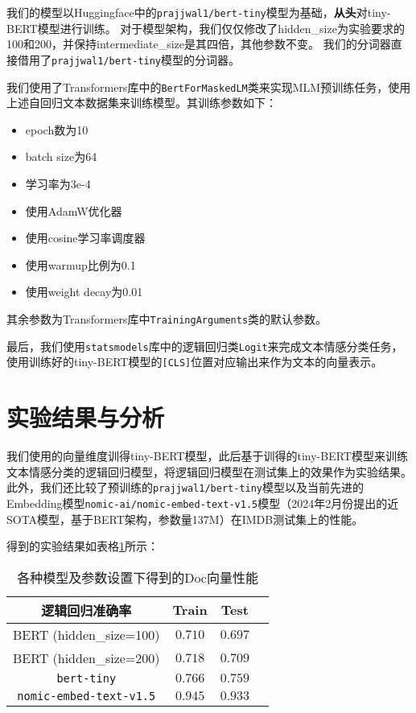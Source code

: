 \documentclass{article}
\begin{document}
我们的模型以Huggingface中的\verb|prajjwal1/bert-tiny|模型为基础，\textbf{从头}对tiny-BERT模型进行训练。
对于模型架构，我们仅仅修改了hidden_size为实验要求的100和200，并保持intermediate_size是其四倍，其他参数不变。
我们的分词器直接借用了\verb|prajjwal1/bert-tiny|模型的分词器。

我们使用了Transformers库中的\verb|BertForMaskedLM|类来实现MLM预训练任务，使用上述自回归文本数据集来训练模型。其训练参数如下：
\begin{itemize}
  \item epoch数为10
  \item batch size为64
  \item 学习率为3e-4
  \item 使用AdamW优化器
  \item 使用cosine学习率调度器
  \item 使用warmup比例为0.1
  \item 使用weight decay为0.01
\end{itemize}
其余参数为Transformers库中\verb|TrainingArguments|类的默认参数。

最后，我们使用\verb|statsmodels|库中的逻辑回归类\verb|Logit|来完成文本情感分类任务，
使用训练好的tiny-BERT模型的\verb|[CLS]|位置对应输出来作为文本的向量表示。



\section{实验结果与分析}

我们使用的向量维度训得tiny-BERT模型，此后基于训得的tiny-BERT模型来训练文本情感分类的逻辑回归模型，将逻辑回归模型在测试集上的效果作为实验结果。
此外，我们还比较了预训练的\verb|prajjwal1/bert-tiny|模型以及当前先进的Embedding模型\verb|nomic-ai/nomic-embed-text-v1.5|模型（2024年2月份提出的近SOTA模型，基于BERT架构，参数量137M）在IMDB测试集上的性能。

得到的实验结果如表格\ref{tab:results}所示：
\begin{table}[htbp]
  \caption{各种模型及参数设置下得到的Doc向量性能}
  \label{tab:results}
  \vspace{5pt}
  \centering
  \begin{tabular}{cccc}
    \toprule
    逻辑回归准确率          & Train   & Test    \\
    \midrule
    BERT (hidden_size=100)  & $0.710$ & $0.697$ \\
    \midrule
    BERT (hidden_size=200)  & $0.718$ & $0.709$ \\
    \midrule
    \verb|bert-tiny| & $0.766$ & $0.759$ \\
    \midrule
    \verb|nomic-embed-text-v1.5| & $0.945$ & $0.933$ \\
    \bottomrule
  \end{tabular}
\end{table}
\end{document}
